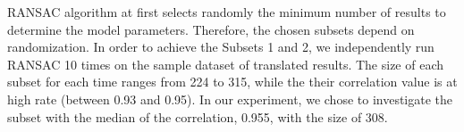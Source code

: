 %
RANSAC algorithm at first selects randomly the minimum number of
results to determine the model parameters. Therefore, the chosen
subsets depend on randomization. In order to achieve the Subsets 1 and
2, we independently run RANSAC 10 times on the sample dataset of
translated results.
%
The size of each subset for each time ranges from 224 to 315, while
the their correlation value is at high rate (between 0.93 and 0.95).
%
In our experiment, we chose to investigate the
subset with the median of the correlation, 0.955, with the
size of 308.
%



%


